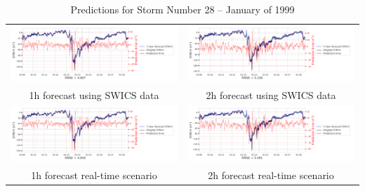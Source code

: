 \documentclass[draft,sw]{agutexSI2019}
\begin{document}
\begin{table}
\centering
\begin{tabular}{cc}
\includegraphics[width=0.49\linewidth]{paper_plots_shade/1h_swics/1h_swics_storm_28.png}
&
\includegraphics[width=0.49\linewidth]{paper_plots_shade/2h_swics/2h_swics_storm_28.png}
\\
1h forecast using SWICS data & 2h forecast using SWICS data
\vspace*{12pt}
\\
\includegraphics[width=0.49\linewidth]{paper_plots_shade/1h_rt/1h_rt_storm_28.png}
&
\includegraphics[width=0.49\linewidth]{paper_plots_shade/2h_rt/2h_rt_storm_28.png}
\\
1h forecast real-time scenario & 2h forecast real-time scenario 
\vspace*{12pt}
\\
\end{tabular}
\caption{Predictions for Storm Number 28 -- January of 1999}
\label{storm-28}
\end{table}
\end{document}
